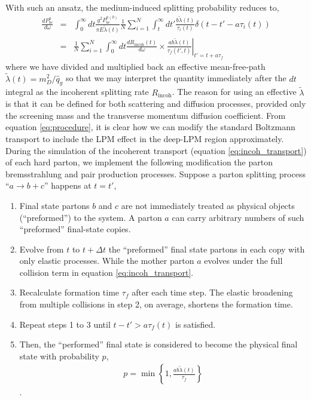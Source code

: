 \documentclass[aps, prc, reprint, amsmath, groupedaddress, nofootinbib]{revtex4-1}
\begin{document}
With such an ansatz, the medium-induced splitting probability reduces to,
\begin{eqnarray}
\nonumber
\frac{dP^{a}_{bc}}{d\omega} &=& \int_0^\infty dt \frac{g^2 P_{bc}^{a(0)}}{\pi E\tilde{\lambda}(t)} \frac{1}{N}\sum_{i=1}^N \int_t^\infty dt' \frac{b \tilde{\lambda}(t)}{\tau_i(t)} \delta(t-t'- a \tau_i(t)) \\
&=& \frac{1}{N}\sum_{i=1}^N\int_0^\infty dt \frac{dR_{\textrm{incoh}}(t)}{d\omega} \times \left.\frac{ab\tilde{\lambda}(t)}{\tau_f(t',t)}\right|_{t'=t+a\tau_f}
\label{eq:procedure}
\end{eqnarray}
where we have divided and multiplied back an effective mean-free-path $\tilde{\lambda}(t) = m_D^2/\hat{q}_g$ so that we may interpret the quantity immediately after the $dt$ integral as the incoherent splitting rate $R_{\textrm{incoh}}$.
The reason for using an effective $\tilde{\lambda}$ is that it can be defined for both scattering and diffusion processes, provided only the screening mass and the transverse momentum diffusion coefficient.
From equation \ref{eq:procedure}, it is clear how we can modify the standard Boltzmann transport to include the LPM effect in the deep-LPM region approximately.
During the simulation of the incoherent transport  (equation \ref{eq:incoh_transport}) of each hard parton, we implement the following modification the parton bremsstrahlung and pair production processes.
Suppose a parton splitting process ``$a\rightarrow b+c$'' happens at $t=t'$,
\begin{enumerate}
\item Final state partons $b$ and $c$ are not immediately treated as physical objects (``preformed'') to the system. A parton $a$ can carry arbitrary numbers of such ``preformed'' final-state copies.
\item Evolve from $t$ to $t+\Delta t$ the ``preformed'' final state partons in each copy with only elastic processes. 
While the mother parton $a$ evolves under the full collision term in equation \ref{eq:incoh_transport}.
\item Recalculate formation time $\tau_f$ after each time step. 
The elastic broadening from multiple collisions in step 2, on average, shortens the formation time.
\item Repeat steps 1 to 3 until $t-t' > a\tau_f(t)$ is satisfied. 
\item Then, the ``performed'' final state is considered to become the physical final state with probability $p$, 
\begin{eqnarray}
p = \min\left\{1, \frac{ab\tilde{\lambda}(t)}{\tau_f}\right\}
\label{eq:rejection}
\end{eqnarray}.
\end{enumerate}
\end{document}
